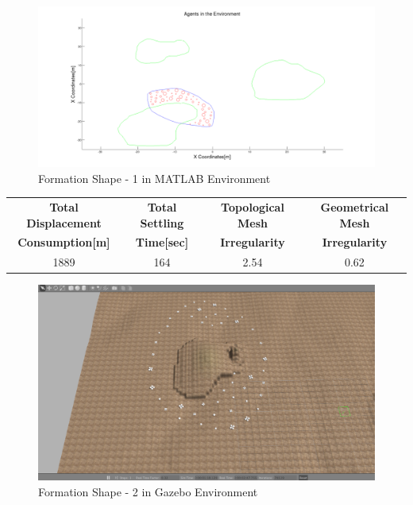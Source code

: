 \begin{figure}[H]
\caption{Formation Shape - 1 in MATLAB Environment}
\centerline{\includegraphics[scale = 0.32]{1}}
\end{figure} 
			
\begin{center}
 \label{perf_shape1} 
\begin{tabular}{||c| c |c |c ||}
					
\hline
\textbf{Total Displacement }  & \textbf{Total Settling} & \textbf{Topological Mesh} & \textbf{Geometrical Mesh} \\ \textbf{Consumption[m]} & \textbf{Time[sec]}& \textbf{Irregularity} & \textbf{Irregularity} \\
\hline
1889 & 164 &  2.54& 0.62\\
\hline
\end{tabular}
\end{center}
	
\begin{figure}[H]
\caption{Formation Shape - 2 in Gazebo Environment}
\centerline{\includegraphics[scale = 0.32]{2_Gazebo}}
\end{figure} 
		 

